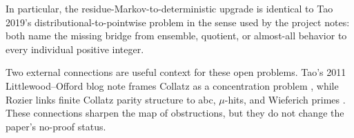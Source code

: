 In particular, the residue-Markov-to-deterministic upgrade is identical to
Tao 2019's distributional-to-pointwise problem in the sense used by the project
notes: both name the missing bridge from ensemble, quotient, or almost-all
behavior to every individual positive integer.

Two external connections are useful context for these open problems.  Tao's
2011 Littlewood--Offord blog note frames Collatz as a concentration problem
\cite{tao2011littlewood}, while Rozier links finite Collatz parity structure
to abc, \(\mu\)-hits, and Wieferich primes \cite{rozier2023abc}.  These
connections sharpen the map of obstructions, but they do not change the
paper's no-proof status.
